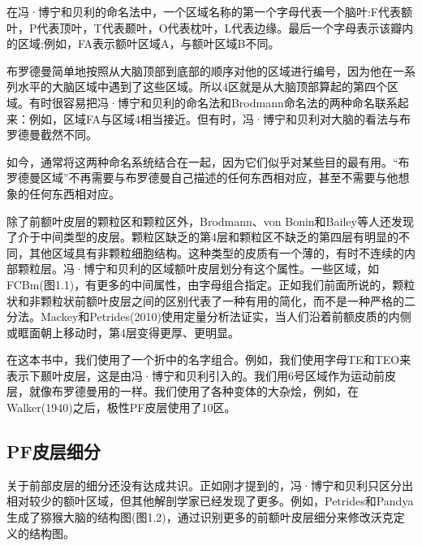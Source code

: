 \par
在冯·博宁和贝利的命名法中，一个区域名称的第一个字母代表一个脑叶:F代表额叶，P代表顶叶，T代表颞叶，O代表枕叶，L代表边缘。最后一个字母表示该瓣内的区域;例如，FA表示额叶区域A，与额叶区域B不同。
\par
布罗德曼简单地按照从大脑顶部到底部的顺序对他的区域进行编号，因为他在一系列水平的大脑区域中遇到了这些区域。所以4区就是从大脑顶部算起的第四个区域。有时很容易把冯·博宁和贝利的命名法和Brodmann命名法的两种命名联系起来：例如，区域FA与区域4相当接近。但有时，冯·博宁和贝利对大脑的看法与布罗德曼截然不同。
\par
如今，通常将这两种命名系统结合在一起，因为它们似乎对某些目的最有用。“布罗德曼区域”不再需要与布罗德曼自己描述的任何东西相对应，甚至不需要与他想象的任何东西相对应。
\par
除了前额叶皮层的颗粒区和颗粒区外，Brodmann、von Bonin和Bailey等人还发现了介于中间类型的皮层。颗粒区缺乏的第4层和颗粒区不缺乏的第四层有明显的不同，其他区域具有非颗粒细胞结构。这种类型的皮质有一个薄的，有时不连续的内部颗粒层。冯·博宁和贝利的区域额叶皮层划分有这个属性。一些区域，如FCBm(图1.1)，有更多的中间属性，由字母组合指定。正如我们前面所说的，颗粒状和非颗粒状前额叶皮层之间的区别代表了一种有用的简化，而不是一种严格的二分法。Mackey和Petrides(2010)使用定量分析法证实，当人们沿着前额皮质的内侧或眶面朝上移动时，第4层变得更厚、更明显。
\par
在这本书中，我们使用了一个折中的名字组合。例如，我们使用字母TE和TEO来表示下颞叶皮层，这是由冯·博宁和贝利引入的。我们用6号区域作为运动前皮层，就像布罗德曼用的一样。我们使用了各种变体的大杂烩，例如，在Walker(1940)之后，极性PF皮层使用了10区。



\subsection{PF皮层细分}
关于前部皮层的细分还没有达成共识。正如刚才提到的，冯·博宁和贝利只区分出相对较少的额叶区域，但其他解剖学家已经发现了更多。例如，Petrides和Pandya生成了猕猴大脑的结构图(图1.2)，通过识别更多的前额叶皮层细分来修改沃克定义的结构图。


